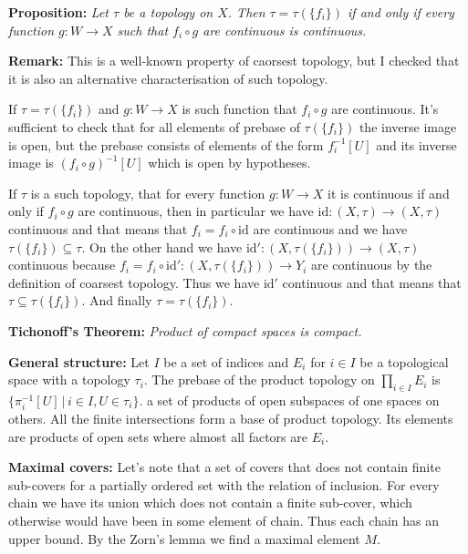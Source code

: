 \textbf{Proposition:} \textit{Let $\tau$ be a topology on $X$. Then $\tau=\tau(\{f_i\})$
if and only if every function $g:W\rightarrow X$ such that $f_i\circ g$ are
continuous is continuous.}
\vspace{1ex}

\textbf{Remark:} This is a well-known property of caorsest topology, but I
checked that it is also an alternative characterisation of such topology.

If $\tau=\tau(\{f_i\})$ and $g:W\rightarrow X$ is such function that $f_i\circ
g$ are continuous. It's sufficient to check that for all elements of prebase
of $\tau(\{f_i\})$ the inverse image is open, but the prebase consists of
elements of the form $f_i^{-1}[U]$ and its inverse image is $(f_i\circ g)^{-1}[U]$
which is open by hypotheses.
\vspace{1ex}

If $\tau$ is a such topology, that for every function $g:W\rightarrow X$ it is
continuous if and only if $f_i\circ g$ are continuous, then in particular we
have $\text{id}:(X,\tau)\rightarrow(X,\tau)$ continuous and that means that $f_i = f_i\circ
\text{id}$ are continuous and we have $\tau(\{f_i\})\subseteq\tau$. On the other
hand we have $\text{id}':(X,\tau(\{f_i\}))\rightarrow(X,\tau)$ continuous
because $f_i = f_i\circ\text{id}':(X,\tau(\{f_i\}))\rightarrow Y_i$ are continuous
by the definition of coarsest topology. Thus we have $\text{id}'$ continuous
and that means that $\tau\subseteq\tau(\{f_i\})$. And finally $\tau=\tau(\{f_i\})$.

\vspace{1ex}

\textbf{Tichonoff's Theorem:} \textit{Product of compact spaces is compact.}
\vspace{1ex}

\textbf{General structure:} Let $I$ be a set of indices and $E_i$ for $i\in I$
be a topological space with a topology $\tau_i$. The prebase of the product
topology on  $\prod_{i\in I} E_i$ is $\{\pi_i^{-1}[U]\,|\,i\in I,U\in\tau_i\}$.
a set of products of open subspaces of one spaces on others. All the finite
intersections form a base of product topology. Its elements are products of
open sets where almost all factors are $E_i$.
\vspace{1ex}

\textbf{Maximal covers:} Let's note that a set of covers that does not contain
finite sub-covers for a partially ordered set with the relation of inclusion.
For every chain we have its union which does not contain a finite sub-cover,
which otherwise would have been in some element of chain. Thus each chain has an
upper bound. By the Zorn's lemma we find a maximal element $M$.
\vspace{1ex}

